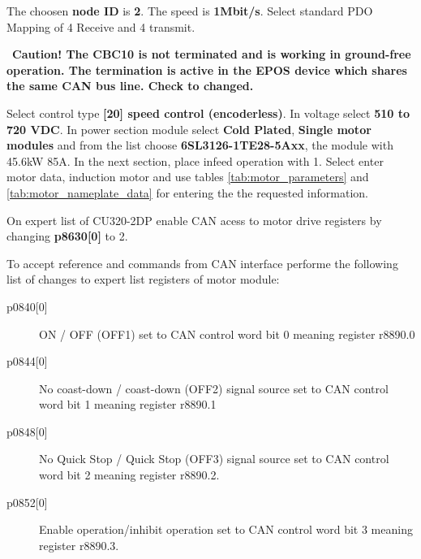 \begin{description}[align=left, labelwidth=10em, leftmargin=5em, style=nextline]
	\item[CAN Module CBC10] The choosen \textbf{node ID} is \textbf{2}. The speed is \textbf{1Mbit/s}. Select standard PDO Mapping of 4 Receive and 4 transmit.
	\vspace{1ex}
	\begin{mdframed}[backgroundcolor=red!20, roundcorner=10pt, innertopmargin=5pt, innerbottommargin=5pt, skipabove=0pt]
		\Warning \, \textbf{Caution! The CBC10 is not terminated and is working in ground-free operation. The termination is active in the \gls{EPOS} device which shares the same CAN bus line. Check \cite{siemens_comissioning_manual} to changed.}
	\end{mdframed}
	\item[Motor configuration:] Select control type \textbf{[20] speed control (encoderless)}. In voltage select \textbf{510 to 720 VDC}. In power section module select \textbf{Cold Plated}, \textbf{Single motor modules} and from the list choose \textbf{6SL3126-1TE28-5Axx}, the module with 45.6kW 85A. In the next section, place infeed operation with 1. Select enter motor data, induction motor and use tables \ref{tab:motor_parameters} and \ref{tab:motor_nameplate_data} for entering the the requested information.
	\item[Enable CAN access to motor drive] On expert list of CU320-2DP enable CAN acess to motor drive registers by changing \textbf{p8630[0]} to 2.
	\item[CAN interconnect] To accept reference and commands from CAN interface performe the following list of changes to expert list registers of motor module:
	\begin{description}
		\item[p0840{[0]}] ON / OFF (OFF1) set to CAN control word bit 0 meaning register r8890.0
		\item[p0844{[0]}] No coast-down / coast-down (OFF2) signal source set to CAN control word bit 1 meaning register r8890.1
		\item[p0848{[0]}] No Quick Stop / Quick Stop (OFF3) signal source set to CAN control word bit 2 meaning register r8890.2.
		\item[p0852{[0]}] Enable operation/inhibit operation set to CAN control word bit 3 meaning register r8890.3.

\end{description}
\end{description}
